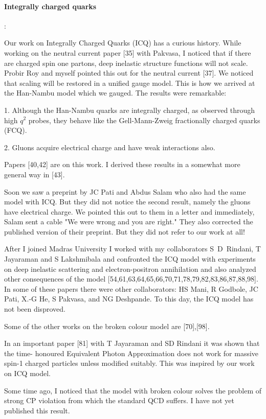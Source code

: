 \paragraph{Integrally charged quarks}:

Our work on Integrally Charged Quarks (ICQ) has a curious history. While 
working on the neutral current paper [35] with Pakvasa, I noticed that 
if there are charged spin one partons, deep inelastic structure 
functions will not scale. Probir Roy and myself pointed this out for the 
neutral current [37]. We noticed that scaling will be restored in a 
unified gauge model. This is how we arrived at the Han-Nambu model which 
we gauged. The results were remarkable:

1. Although the Han-Nambu quarks are integrally charged, as observed 
through high $q^2$ probes, they behave like the Gell-Mann-Zweig 
fractionally charged quarks (FCQ).

2. Gluons acquire electrical charge and have weak interactions also.

Papers [40,42] are on this work. I derived these results in a somewhat 
more general way in [43].

Soon we saw a preprint by JC Pati and Abdus Salam who also had the same 
model with ICQ. But they did not notice the second result, namely the 
gluons have electrical charge. We pointed this out to them in a letter 
and immediately, Salam sent a cable "We were wrong and you are right." 
They also corrected the published version of their preprint. But they 
did not refer to our work at all!

After I joined Madras University I worked with my collaborators 
S~D~Rindani, T Jayaraman and S Lakshmibala and confronted the ICQ model with 
experiments on deep inelastic scattering and electron-positron 
annihilation and also analyzed other consequences of the model 
[54,61,63,64,65,66,70,71,78,79,82,83,86,87,88,98]. In some of these 
papers there were other collaborators: HS Mani, R Godbole, JC Pati, X.-G 
He, S Pakvasa, and NG Deshpande. To this day, the ICQ model has not been 
disproved.

Some of the other works on the broken colour model are [70],[98].

In an important paper [81] with T Jayaraman and SD Rindani it was shown 
that the time- honoured Equivalent Photon Approximation does not work 
for massive spin-1 charged particles unless modified suitably. This was 
inspired by our work on ICQ model.

Some time ago, I noticed that the model with broken colour solves the 
problem of strong CP violation from which the standard QCD suffers. I 
have not yet published this result.

